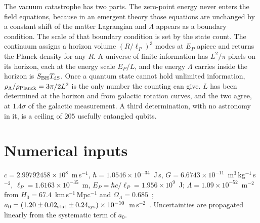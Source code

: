 \documentclass[aps,prd,twocolumn,superscriptaddress,nofootinbib,showkeys]{revtex4-2}
\begin{document}
The vacuum catastrophe has two parts. The zero-point energy never enters the field equations, because in an emergent theory those equations are unchanged by a constant shift of the matter Lagrangian and $\Lambda$ appears as a boundary condition. The scale of that boundary condition is set by the state count. The continuum assigns a horizon volume $(R/\ell_P)^3$ modes at $E_P$ apiece and returns the Planck density for any $R$. A universe of finite information has $L^2/\pi$ pixels on its horizon, each at the energy scale $E_P/L$, and the energy $\Lambda$ carries inside the horizon is $S_{\rm BH}T_{\rm dS}$. Once a quantum state cannot hold unlimited information, $\rho_\Lambda/\rho_{\rm Planck}=3\pi/2L^2$ is the only number the counting can give. $L$ has been determined at the horizon and from galactic rotation curves, and the two agree, at $1.4\sigma$ of the galactic measurement. A third determination, with no astronomy in it, is a ceiling of $205$ usefully entangled qubits.

\appendix

\section{Numerical inputs}
\label{app:numbers}

$c=2.99792458\times10^8$~m\,s$^{-1}$, $\hbar=1.0546\times10^{-34}$~J\,s, $G=6.6743\times10^{-11}$~m$^3$\,kg$^{-1}$\,s$^{-2}$, $\ell_P=1.6163\times10^{-35}$~m, $E_P = \hbar c/\ell_P = 1.956\times10^{9}$~J; $\Lambda=1.09\times10^{-52}$~m$^{-2}$ from $H_0=67.4$~km\,s$^{-1}$\,Mpc$^{-1}$ and $\Omega_\Lambda=0.685$~\cite{planck2018}; $a_0=(1.20\pm0.02_{\rm stat}\pm0.24_{\rm sys})\times10^{-10}$~m\,s$^{-2}$~\cite{mcgaugh2016}. Uncertainties are propagated linearly from the systematic term of $a_0$.
\end{document}

